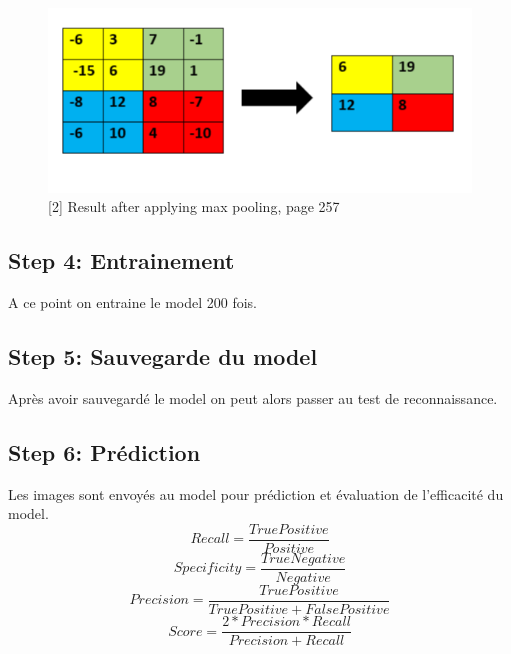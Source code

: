 \documentclass[12pt, letterpaper]{article}
\begin{document}
\begin{figure}[H]
    \includegraphics[width=\linewidth]{images/maxpooling.png}
    \caption{[2] Result after applying max pooling, page 257}
    \label{fig:L1}
\end{figure}
\subsection{Step 4: Entrainement}
\par A ce point on entraine le model 200 fois.
\subsection{Step 5: Sauvegarde du model }
\par Après avoir sauvegardé le model on peut alors passer au test de reconnaissance.
\subsection{Step 6: Prédiction}
\par Les images sont envoyés au model pour prédiction et évaluation de l'efficacité du model.
$$ Recall = \frac{TruePositive}{Positive }$$
$$ Specificity = \frac{TrueNegative}{Negative}$$
$$ Precision = \frac{TruePositive}{TruePositive + FalsePositive}$$
$$ Score = \frac{2*Precision*Recall}{Precision+Recall}$$
\end{document}
